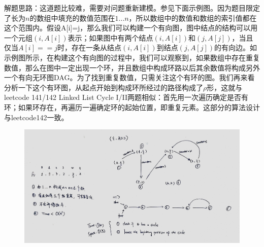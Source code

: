 \documentclass[a4paper,10pt]{article}
\begin{document}
\begin{CJK*}{UTF8}{gbsn}
\noindent 解题思路：这道题比较难，需要对问题重新建模。参见下面示例图。因为题目限定了长为$n$的数组中填充的数值范围在$1 \dots n$，所以数组中的数值和数组的索引值都在这个范围内。假设A[i]=j，那么我们可以构建一个有向图，图中结点的结构可以用一个元组$(i,A[i])$表示；如果图中有两个结点$(i,A[i])$和$(j,A[j])$，当且仅当$A[i]==j$时，存在一条从结点$(i,A[i])$到结点$(j,A[j])$的有向边。如示例图所示，在构建这个有向图的过程中，我们可以观察到，如果数组中存在重复数值，那么在图中一定出现一个环，并且数组中构成环路以后其余数值将构成另外一个有向无环图DAG。为了找到重复数值，只需关注这个有环的图。我们再来看分析一下这个有环图，从起点开始到构成环所经过的路径构成了$\rho$形，这就与leetcode 141/142 Linked List Cycle I/II两题相似：首先用一次遍历确定是否有环；如果环存在，再遍历一遍确定环的起始位置，即重复元素。这部分的算法设计与leetcode142一致。
\end{CJK*}

\begin{figure}[h]
    \includegraphics[width=\textwidth]{leetcode287.jpg}
    \centering \\
\end{figure}
\end{document}
